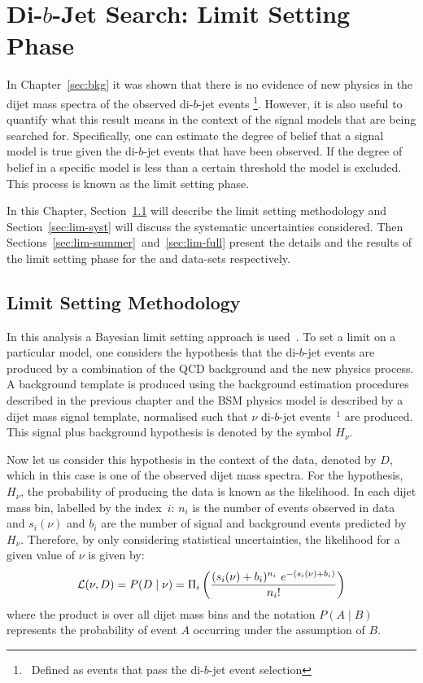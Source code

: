 \chapter{Di-$b$-Jet Search: Limit Setting Phase}
\label{sec:lim}

In Chapter~\ref{sec:bkg} it was shown that there is no evidence of new physics in the dijet mass spectra of the observed di-$b$-jet events
\footnote{\ Defined as events that pass the di-$b$-jet event selection}. %
However, it is also useful to quantify what this result means in the context
of the signal models that are being searched for.
Specifically, one can estimate the degree of belief that a signal model is true given the di-$b$-jet events that have been observed.
If the degree of belief in a specific model is less than a certain threshold the model is excluded.
This process is known as the limit setting phase.

In this Chapter,
Section~\ref{sec:lim-strat} will describe the limit setting methodology and
Section~\ref{sec:lim-syst} will discuss the systematic uncertainties considered.
Then Sections~\ref{sec:lim-summer}~and~\ref{sec:lim-full} present the details and
the results of the limit setting phase for the \summer{} and \lm{} data-sets respectively.

\section{Limit Setting Methodology}
\label{sec:lim-strat}

In this analysis a Bayesian limit setting approach is used~\cite{det-thesis_kate,lim-bayes}.
To set a limit on a particular model, one considers the hypothesis that the di-$b$-jet events
are produced by a combination of the QCD background and the new physics process.
A background template is produced using the background estimation procedures described in the previous chapter
and the BSM physics model is described by a dijet mass signal template, normalised such that $\nu$ di-$b$-jet events~$^{1}$ are produced.  %
This signal plus background hypothesis is denoted by the symbol $H_{\nu}$.

Now let us consider this hypothesis in the context of the data, denoted by $D$,
which in this case is one of the observed dijet mass spectra.
For the hypothesis, $H_{\nu}$, the probability of producing the data is known as the likelihood.
In each dijet mass bin, labelled by the index~$i$: $n_i$ is the number of events observed in data
and $s_i(\nu)$ and $b_i$ are the number of signal and background events predicted by $H_{\nu}$.
Therefore, by only considering statistical uncertainties, the likelihood for a given value of $\nu$ is given by:
\begin{equation}
  \mathcal{L} (\nu,D) = P(D \mid \nu) =  \Pi_i \left(\frac{(s_i(\nu)+b_i)^{n_i}~e^{-(s_i(\nu)+b_i)}}{n_i!}\right)
  \label{eqn:lim-like}
\end{equation}
where the product is over all dijet mass bins and
the notation $P(A \mid B)$ represents the probability of event $A$ occurring
under the assumption of $B$.

